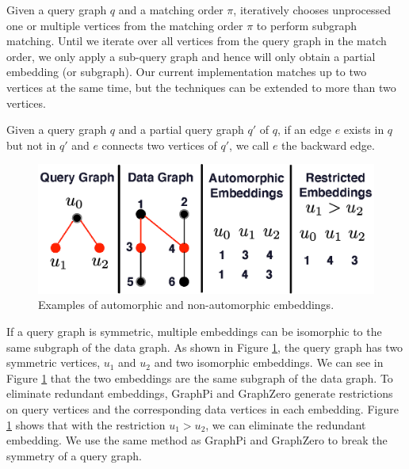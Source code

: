  Given a query graph $q$ and a matching order $\pi$, \SystemName iteratively chooses unprocessed one or
multiple vertices from the matching order $\pi$ to perform subgraph matching. Until we iterate over all vertices from the query graph in
the match order, we only apply a sub-query graph and hence will only obtain a partial embedding (or subgraph). Our current implementation
matches up to two vertices at the same time, but the techniques can be extended to more than two vertices.


 Given a query graph $q$ and a partial query graph $q'$ of $q$, if an edge $e$ exists in $q$ but not in $q'$ and
$e$ connects two vertices of $q'$, we call $e$ the backward edge.

\begin{figure}
\centering
\includegraphics[width=\columnwidth]{./figure/automorphism.eps}
\caption{Examples of automorphic and non-automorphic embeddings.}	
\label{fig:automo}
\end{figure}

If a query graph is symmetric, multiple embeddings can be isomorphic to the same subgraph of the data graph. As shown in Figure
\ref{fig:automo}, the query graph has two symmetric vertices, $u_1$ and $u_2$ and two isomorphic embeddings. We can see in Figure
\ref{fig:automo} that the two embeddings are the same subgraph of the data graph. To eliminate redundant embeddings, GraphPi
\cite{shi2020graphpi} and GraphZero \cite{mawhirter2019graphzero} generate restrictions on query vertices and the corresponding data
vertices in each embedding. Figure \ref{fig:automo} shows that with the restriction $u_1 > u_2$, we can eliminate the redundant embedding.
We use the same method as GraphPi and GraphZero to break the symmetry of a query graph.

